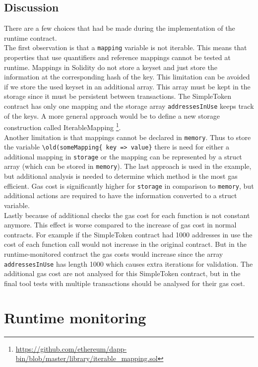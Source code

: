 \documentclass[a4paper]{article}
\begin{document}
\subsection{Discussion}
There are a few choices that had be made during the implementation of the runtime contract. \\
The first observation is that a \texttt{mapping} variable is not iterable. This means that properties that use quantifiers and reference mappings cannot be tested at runtime. Mappings in Solidity do not store a keyset and just store the information at the corresponding hash of the key.  This limitation can be avoided if we store the used keyset in an additional array. This array must be kept in the storage since it must be persistent between transactions. The SimpleToken contract has only one mapping and the storage array \texttt{addressesInUse} keeps track of the keys. A more general approach would be to define a new storage construction called IterableMapping \footnote{\url{https://github.com/ethereum/dapp-bin/blob/master/library/iterable_mapping.sol}}. \\
Another limitation is that mappings cannot be declared in \texttt{memory}. Thus to store the variable \texttt{\textbackslash old(someMapping\{ key => value\}} there is  need for either a additional mapping in \texttt{storage} or the mapping can be represented by a struct array (which can be stored in \texttt{memory}). The last approach is used in the example, but additional analysis is needed to determine which method is the most gas efficient. Gas cost is significantly higher for \texttt{storage} in comparison to \texttt{memory}, but additional actions are required to have the information converted to a struct variable.\\
Lastly because of additional checks the gas cost for each function is not constant anymore. This effect is worse compared to the increase of gas cost in normal contracts. For example if the SimpleToken contract had 1000 addresses in use the cost of each function call would not increase in the original contract. But in the runtime-monitored contract the gas costs would increase since the array \texttt{addressesInUse} has length 1000 which causes extra iterations for validation. The additional gas cost are not analysed for this SimpleToken contract, but in the final tool tests with multiple transactions should be analysed for their gas cost.


\section{Runtime monitoring} 
\end{document}
